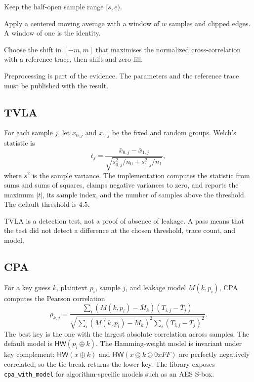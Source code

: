 \documentclass[11pt,a4paper]{article}
\newcommand{\HW}{\mathsf{HW}}
\newcommand{\code}[1]{\texttt{#1}}
\theoremstyle{plain}
\theoremstyle{definition}
\theoremstyle{remark}
\begin{document}
\begin{description}[leftmargin=1.5em]
  \item[Trim.] Keep the half-open sample range \([s,e)\).
  \item[Filter.] Apply a centered moving average with a window of \(w\) samples and
        clipped edges. A window of one is the identity.
  \item[Align.] Choose the shift in \([-m,m]\) that maximises the normalized
        cross-correlation with a reference trace, then shift and zero-fill.
\end{description}

Preprocessing is part of the evidence. The parameters and the reference trace must be
published with the result.

\subsection{TVLA}

For each sample \(j\), let \(x_{0,j}\) and \(x_{1,j}\) be the fixed and random groups.
Welch's statistic is
\[
  t_j = \frac{\bar{x}_{0,j}-\bar{x}_{1,j}}
             {\sqrt{s_{0,j}^2/n_0+s_{1,j}^2/n_1}},
\]
where \(s^2\) is the sample variance. The implementation computes the statistic from
sums and sums of squares, clamps negative variances to zero, and reports the maximum
\(|t|\), its sample index, and the number of samples above the threshold. The default
threshold is \(4.5\).

TVLA is a detection test, not a proof of absence of leakage. A pass means that the
test did not detect a difference at the chosen threshold, trace count, and model.

\subsection{CPA}

For a key guess \(k\), plaintext \(p_i\), sample \(j\), and leakage model
\(M(k,p_i)\), CPA computes the Pearson correlation
\[
  \rho_{k,j} =
  \frac{\sum_i (M(k,p_i)-\bar{M}_k)(T_{i,j}-\bar{T}_j)}
       {\sqrt{\sum_i (M(k,p_i)-\bar{M}_k)^2
              \sum_i (T_{i,j}-\bar{T}_j)^2}}.
\]
The best key is the one with the largest absolute correlation across samples. The
default model is \(\HW(p_i\oplus k)\). The Hamming-weight model is invariant under key
complement: \(\HW(x\oplus k)\) and \(\HW(x\oplus k\oplus 0xFF)\) are perfectly
negatively correlated, so the tie-break returns the lower key. The library exposes
\code{cpa\_with\_model} for algorithm-specific models such as an AES S-box.
\end{document}
